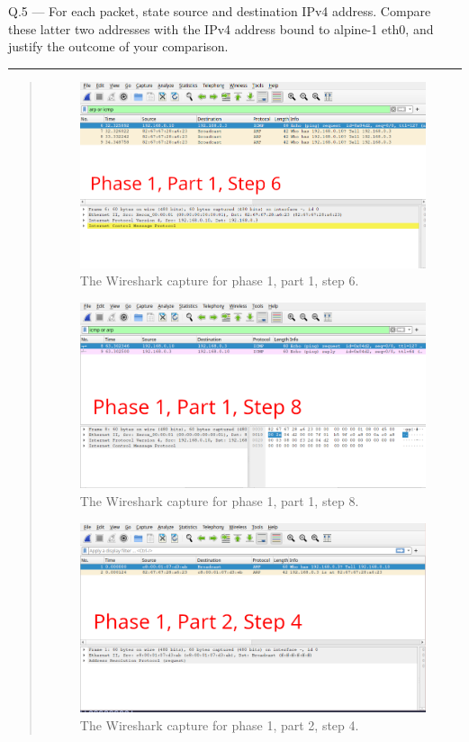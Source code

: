 \documentclass{article}
\newcommand\Que[2]{%
   \begin{samepage}
   \leavevmode\par
   \noindent
   Q.#1 --- #2\par\vspace{10pt}\hrule\vspace{10pt}
   \end{samepage}}
\newenvironment{ans}
   {\fbox{Answer}\begin{quote}\nopagebreak}
   {\end{quote}}
\begin{document}
\Que{5}{For each packet, state source and destination IPv4
address. Compare these latter two addresses with the IPv4
address bound to alpine-1 eth0, and justify the outcome of your
comparison.}

\begin{ans}
	\begin{figure}[H]
		\centering
		\includegraphics[width=14cm]{data/q5-capture1.png}
		\caption{The Wireshark capture for phase 1, part 1, step 6.}
		\label{fig:wireshark-capture1-q5}
	\end{figure}
	
	\begin{figure}[H]
		\centering
		\includegraphics[width=14cm]{data/q5-capture2.png}
		\caption{The Wireshark capture for phase 1, part 1, step 8.}
		\label{fig:wireshark-capture2-q5}
	\end{figure}
	
	\begin{figure}[H]
		\centering
		\includegraphics[width=14cm]{data/q5-capture3.png}
		\caption{The Wireshark capture for phase 1, part 2, step 4.}
		\label{fig:wireshark-capture3-q5}
	\end{figure}
	

\end{ans}
\end{document}
